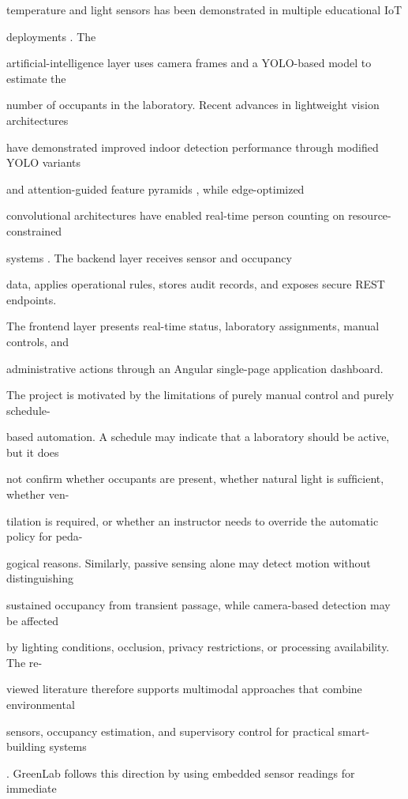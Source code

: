 temperature and light sensors has been demonstrated in multiple educational IoT

deployments \cite{basheer2021,simanungkalit2020}. The

artiﬁcial-intelligence layer uses camera frames and a YOLO-based model to estimate the

number of occupants in the laboratory. Recent advances in lightweight vision architectures

have demonstrated improved indoor detection performance through modiﬁed YOLO variants

and attention-guided feature pyramids \cite{choi2023,zhang2024}, while edge-optimized

convolutional architectures have enabled real-time person counting on resource-constrained

systems \cite{mitchell2024,lee2024}. The backend layer receives sensor and occupancy

data, applies operational rules, stores audit records, and exposes secure REST endpoints.

The frontend layer presents real-time status, laboratory assignments, manual controls, and

administrative actions through an Angular single-page application dashboard.

The project is motivated by the limitations of purely manual control and purely schedule-

based automation. A schedule may indicate that a laboratory should be active, but it does

not conﬁrm whether occupants are present, whether natural light is sufﬁcient, whether ven-

tilation is required, or whether an instructor needs to override the automatic policy for peda-

gogical reasons. Similarly, passive sensing alone may detect motion without distinguishing

sustained occupancy from transient passage, while camera-based detection may be affected

by lighting conditions, occlusion, privacy restrictions, or processing availability. The re-

viewed literature therefore supports multimodal approaches that combine environmental

sensors, occupancy estimation, and supervisory control for practical smart-building systems

\cite{chaudhari2024,waghchoure2025}. GreenLab follows this direction by using embedded sensor readings for immediate

